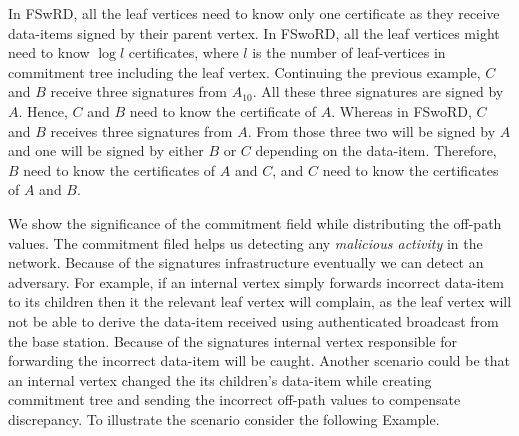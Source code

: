 		In FSwRD, all the leaf vertices need to know only one certificate as they receive data-items signed by their parent vertex.
		In FSwoRD, all the leaf vertices might need to know $\log l$ certificates, where $l$ is the number of leaf-vertices in commitment tree including the leaf vertex.
		Continuing the previous example, $C$ and $B$ receive three signatures from $A_{10}$. 
		All these three signatures are signed by $A$.
		Hence, $C$ and $B$ need to know the certificate of $A$.  
		Whereas in FSwoRD, $C$ and $B$ receives three signatures from $A$.
		From those three two will be signed by $A$ and one will be signed by either $B$ or $C$ depending on the data-item. 
		Therefore, $B$ need to know the certificates of $A$ and $C$, and $C$ need to know the certificates of $A$ and $B$.

		We show the significance of the commitment field while distributing the off-path values. 
		The commitment filed helps us detecting any \textit{malicious activity} in the network. 
		Because of the signatures infrastructure eventually we can detect an adversary. 
		For example, if an internal vertex simply forwards incorrect data-item to its children then it the relevant leaf vertex will complain, as the leaf vertex will not be able to derive the data-item received using authenticated broadcast from the base station.
		Because of the signatures internal vertex responsible for forwarding the incorrect data-item will be caught.
		Another scenario could be that an internal vertex changed the its children's data-item while creating commitment tree and sending the incorrect off-path values to compensate discrepancy. 
		To illustrate the scenario consider the following Example.


